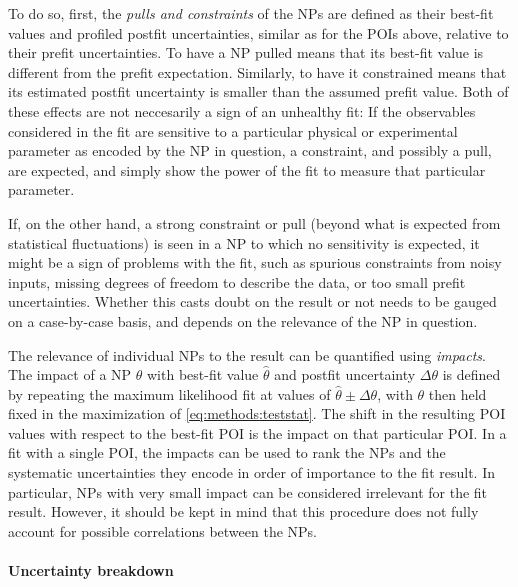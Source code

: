 To do so, first, the \textit{pulls and constraints} of the NPs are defined as their best-fit values and profiled postfit uncertainties, similar as for the POIs above, relative to their prefit uncertainties. To have a NP pulled means that its best-fit value is different from the prefit expectation. Similarly, to have it constrained means that its estimated postfit uncertainty is smaller than the assumed prefit value. Both of these effects are not neccesarily a sign of an unhealthy fit: If the observables considered in the fit are sensitive to a particular physical or experimental parameter as encoded by the NP in question, a constraint, and possibly a pull, are expected, and simply show the power of the fit to measure that particular parameter.

If, on the other hand, a strong constraint or pull (beyond what is expected from statistical fluctuations) is seen in a NP to which no sensitivity is expected, it might be a sign of problems with the fit, such as spurious constraints from noisy inputs, missing degrees of freedom to describe the data, or too small prefit uncertainties. Whether this casts doubt on the result or not needs to be gauged on a case-by-case basis, and depends on the relevance of the NP in question.

The relevance of individual NPs to the result can be quantified using \textit{impacts}. The impact of a NP $\theta$ with best-fit value $\hat{\theta}$ and postfit uncertainty $\Delta \theta$ is defined by repeating the maximum likelihood fit at values of $\hat{\theta} \pm \Delta \theta$, with $\theta$ then held fixed in the maximization of \cref{eq:methods:teststat}. The shift in the resulting POI values with respect to the best-fit POI is the impact on that particular POI. In a fit with a single POI, the impacts can be used to rank the NPs and the systematic uncertainties they encode in order of importance to the fit result. In particular, NPs with very small impact can be considered irrelevant for the fit result. However, it should be kept in mind that this procedure does not fully account for possible correlations between the NPs.

\paragraph{Uncertainty breakdown} 

